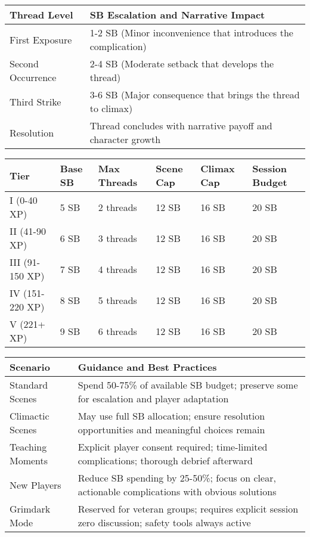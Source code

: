 \begin{fatebox}
\begin{tabularx}{\textwidth}{lX}
\toprule
\textbf{Thread Level} & \textbf{SB Escalation and Narrative Impact} \\
\midrule
First Exposure & 1-2 SB (Minor inconvenience that introduces the complication) \\
Second Occurrence & 2-4 SB (Moderate setback that develops the thread) \\
Third Strike & 3-6 SB (Major consequence that brings the thread to climax) \\
Resolution & Thread concludes with narrative payoff and character growth \\
\bottomrule
\end{tabularx}
\end{fatebox}

\begin{fatebox}
\begin{tabularx}{\textwidth}{lXXXXX}
\toprule
\textbf{Tier} & \textbf{Base SB} & \textbf{Max Threads} & \textbf{Scene Cap} & \textbf{Climax Cap} & \textbf{Session Budget} \\
\midrule
I (0-40 XP) & 5 SB & 2 threads & 12 SB & 16 SB & 20 SB \\
II (41-90 XP) & 6 SB & 3 threads & 12 SB & 16 SB & 20 SB \\
III (91-150 XP) & 7 SB & 4 threads & 12 SB & 16 SB & 20 SB \\
IV (151-220 XP) & 8 SB & 5 threads & 12 SB & 16 SB & 20 SB \\
V (221+ XP) & 9 SB & 6 threads & 12 SB & 16 SB & 20 SB \\
\bottomrule
\end{tabularx}
\end{fatebox}

\begin{fatebox}
\begin{tabularx}{\textwidth}{lX}
\toprule
\textbf{Scenario} & \textbf{Guidance and Best Practices} \\
\midrule
Standard Scenes & Spend 50-75\% of available SB budget; preserve some for escalation and player adaptation \\
Climactic Scenes & May use full SB allocation; ensure resolution opportunities and meaningful choices remain \\
Teaching Moments & Explicit player consent required; time-limited complications; thorough debrief afterward \\
New Players & Reduce SB spending by 25-50\%; focus on clear, actionable complications with obvious solutions \\
Grimdark Mode & Reserved for veteran groups; requires explicit session zero discussion; safety tools always active \\
\bottomrule
\end{tabularx}
\end{fatebox}

